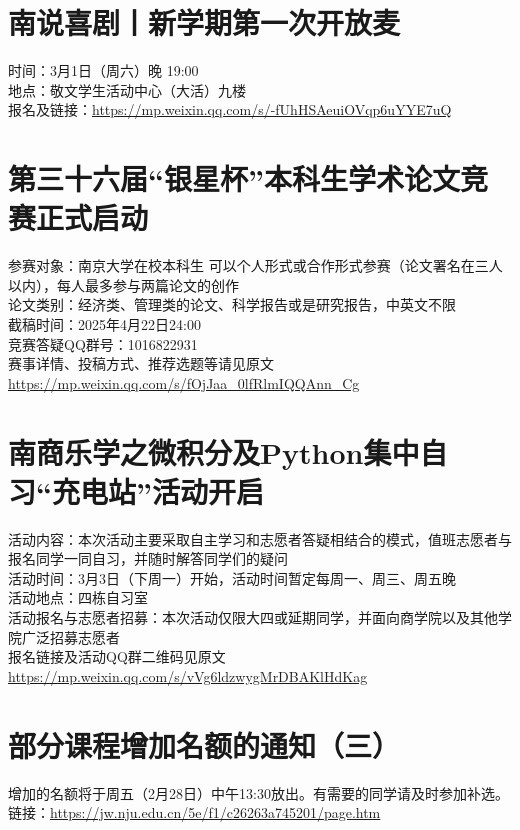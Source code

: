 \documentclass[letterpaper, 12pt]{article}
\begin{document}
\begin{multicols}{2}
\section{南说喜剧丨新学期第一次开放麦}
时间：3月1日（周六）晚 19:00\\
地点：敬文学生活动中心（大活）九楼\\
报名及链接：\url{https://mp.weixin.qq.com/s/-fUhHSAeuiOVqp6uYYE7uQ}\\
\section{第三十六届“银星杯”本科生学术论文竞赛正式启动}
参赛对象：南京大学在校本科生 可以个人形式或合作形式参赛（论文署名在三人以内），每人最多参与两篇论文的创作\\
论文类别：经济类、管理类的论文、科学报告或是研究报告，中英文不限\\
截稿时间：2025年4月22日24:00\\
竞赛答疑QQ群号：1016822931\\
赛事详情、投稿方式、推荐选题等请见原文
\url{https://mp.weixin.qq.com/s/fOjJaa_0lfRlmIQQAnn_Cg}\\

\section{南商乐学之微积分及Python集中自习“充电站”活动开启}
活动内容：本次活动主要采取自主学习和志愿者答疑相结合的模式，值班志愿者与报名同学一同自习，并随时解答同学们的疑问\\
活动时间：3月3日（下周一）开始，活动时间暂定每周一、周三、周五晚\\
活动地点：四栋自习室\\
活动报名与志愿者招募：本次活动仅限大四或延期同学，并面向商学院以及其他学院广泛招募志愿者\\
报名链接及活动QQ群二维码见原文\url{https://mp.weixin.qq.com/s/vVg6ldzwygMrDBAKlHdKag}\\

\section{部分课程增加名额的通知（三）}
增加的名额将于周五（2月28日）中午13:30放出。有需要的同学请及时参加补选。\\
链接：\url{https://jw.nju.edu.cn/5e/f1/c26263a745201/page.htm}\\


\end{multicols}
\end{document}
